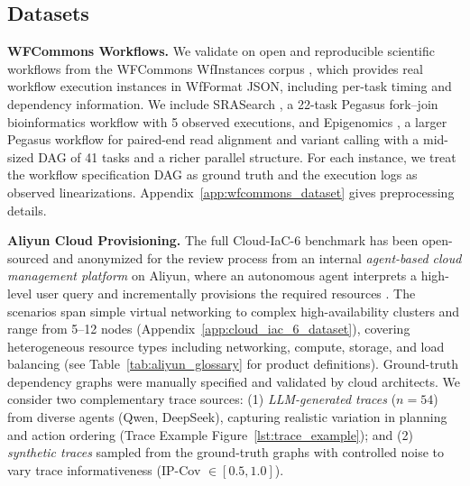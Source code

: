 \documentclass{article}
\theoremstyle{plain}
\theoremstyle{definition}
\theoremstyle{remark}
\begin{document}
\subsection{Datasets}

\noindent \textbf{WFCommons Workflows.}
We validate on open and reproducible scientific workflows from the WFCommons WfInstances corpus \citep{coleman2022wfcommons}, which provides real workflow execution instances in WfFormat JSON, including per-task timing and dependency information.
We include SRASearch \citep{wfcommons_srasearch}, a 22-task Pegasus fork--join bioinformatics workflow with 5 observed executions, and Epigenomics \citep{juve2013characterizing}, a larger Pegasus workflow for paired-end read alignment and variant calling with a mid-sized DAG of 41 tasks and a richer parallel structure.
For each instance, we treat the workflow specification DAG as ground truth and the execution logs as observed linearizations.
Appendix~\ref{app:wfcommons_dataset} gives preprocessing details.

\noindent \textbf{Aliyun Cloud Provisioning.}
The full Cloud-IaC-6 benchmark has been open-sourced and anonymized for the review process from an internal \emph{agent-based cloud management platform} on Aliyun, where an autonomous agent interprets a high-level user query and incrementally provisions the required resources \citep{aliyun_agent_workflows}.
The scenarios span simple virtual networking to complex high-availability clusters and range from 5--12 nodes (Appendix~\ref{app:cloud_iac_6_dataset}), covering heterogeneous resource types including networking, compute, storage, and load balancing (see Table~\ref{tab:aliyun_glossary} for product definitions).
Ground-truth dependency graphs were manually specified and validated by cloud architects.
We consider two complementary trace sources:
(1) \emph{LLM-generated traces} ($n=54$) from diverse agents (Qwen, DeepSeek), capturing realistic variation in planning and action ordering (Trace Example Figure~\ref{lst:trace_example});
and (2) \emph{synthetic traces} sampled from the ground-truth graphs with controlled noise to vary trace informativeness (IP-Cov $\in [0.5, 1.0]$).
\end{document}
